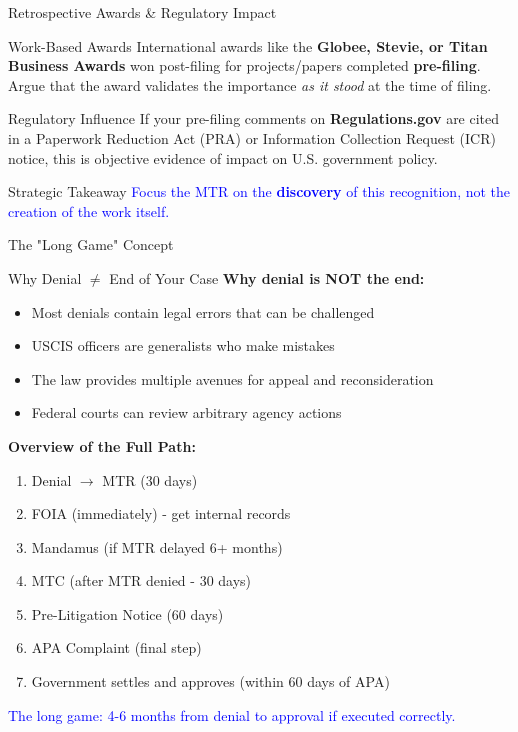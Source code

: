 \documentclass[11pt]{beamer}
\begin{document}
	
	
	\begin{frame}{Retrospective Awards \& Regulatory Impact}
		\scriptsize
		\begin{block}{Work-Based Awards}
			International awards like the \textbf{Globee, Stevie, or Titan Business Awards} won post-filing for projects/papers completed \textbf{pre-filing}. Argue that the award validates the importance \textit{as it stood} at the time of filing.
		\end{block}
		
		\begin{block}{Regulatory Influence}
			If your pre-filing comments on \textbf{Regulations.gov} are cited in a Paperwork Reduction Act (PRA) or Information Collection Request (ICR) notice, this is objective evidence of impact on U.S. government policy.
		\end{block}
		
		\begin{block}{Strategic Takeaway}
			\textcolor{blue}{Focus the MTR on the \textbf{discovery} of this recognition, not the creation of the work itself.}
		\end{block}
	\end{frame}
	
	
	\begin{frame}{The "Long Game" Concept}
		\scriptsize
		\begin{block}{Why Denial $\neq$ End of Your Case}
			\textbf{Why denial is NOT the end:}
			\begin{itemize}
				\item Most denials contain legal errors that can be challenged
				\item USCIS officers are generalists who make mistakes
				\item The law provides multiple avenues for appeal and reconsideration
				\item Federal courts can review arbitrary agency actions
			\end{itemize}
			\textbf{Overview of the Full Path:}
			\begin{enumerate}
				\item Denial $\rightarrow$ MTR (30 days)
				\item FOIA (immediately) - get internal records
				\item Mandamus (if MTR delayed 6+ months)
				\item MTC (after MTR denied - 30 days)
				\item Pre-Litigation Notice (60 days)
				\item APA Complaint (final step)
				\item Government settles and approves (within 60 days of APA)
			\end{enumerate}
			\textcolor{blue}{The long game: 4-6 months from denial to approval if executed correctly.}
		\end{block}
	\end{frame}
	
\end{document}
